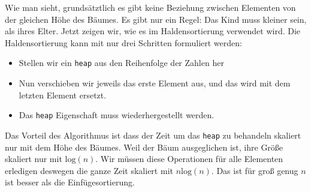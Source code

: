 Wie man sieht, grundsätztlich es gibt keine Beziehung zwischen Elementen von der 
gleichen Höhe des Bäumes. Es gibt nur ein Regel: Das Kind muss kleiner sein, als ihres
Elter. Jetzt zeigen wir, wie es im Haldensortierung verwendet wird.
Die Haldensortierung kann mit nur drei Schritten formuliert werden:
\begin{itemize}
\item Stellen wir ein \texttt{heap} aus den Reihenfolge der Zahlen her
\item Nun verschieben wir jeweils das erste Element aus, und das wird mit dem letzten Element 
ersetzt.
\item Das \texttt{heap} Eigenschaft muss wiederhergestellt werden.
\end{itemize}

Das Vorteil des Algorithmus ist dass der Zeit um das \texttt{heap} zu behandeln skaliert
nur mit dem Höhe des Bäumes. Weil der Bäum ausgeglichen ist, ihre Größe skaliert nur mit
$\mathrm{log}(n)$. Wir müssen diese Operationen für alle Elementen erledigen 
deswegen die ganze Zeit skaliert mit $n\mathrm{log}(n)$. Das ist für groß genug $n$ ist
besser als die Einfügesortierung.

